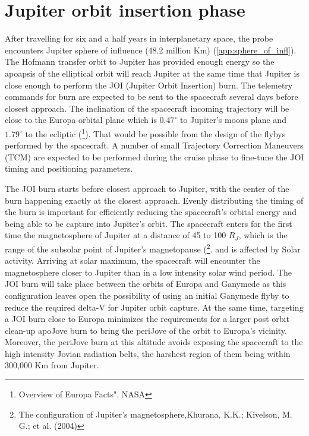 \section{Jupiter orbit insertion phase}
After travelling for six and a half years in interplanetary space, the probe encounters Jupiter sphere of influence (48.2 million Km) (\ref{app:sphere_of_infl}). The Hofmann transfer orbit to Jupiter has provided enough energy so the apoapsis of the elliptical orbit will reach Jupiter at the same time that Jupiter is close enough to perform the JOI (Jupiter Orbit Insertion) burn. The telemetry commands for burn are expected to be sent to the spacecraft several days before closest approach. The inclination of the spacecraft incoming trajectory will be close to the Europa orbital plane which is $0.47^\circ$ to Jupiter’s moons plane and $1.79^\circ$ to the ecliptic (\footnote{Overview of Europa Facts". NASA}). That would be possible from the design of the flybys performed by the spacecraft. A number of small Trajectory Correction Maneuvers (TCM) are expected to be performed during the cruise phase to fine-tune the JOI timing and positioning parameters.

The JOI burn starts before closest approach to Jupiter, with the center of the burn happening exactly at the closest approach. Evenly distributing the timing of the burn is important for efficiently reducing the spacecraft’s orbital energy and being able to be capture into Jupiter's orbit. The spacecraft enters for the first time the magnetosphere of Jupiter at a distance of 45 to 100 $R_J$, which is the range of the subsolar point of Jupiter’s magnetopause (\footnote{The configuration of Jupiter's magnetosphere,Khurana, K.K.; Kivelson, M. G.; et al. (2004)}. and is affected by Solar activity. Arriving at solar maximum, the spacecraft will encounter the magnetosphere closer to Jupiter than in a low intensity solar wind period. The JOI burn will take place between the orbits of Europa and Ganymede as this configuration leaves open the possibility of using an initial Ganymede flyby to reduce the required delta-V for Jupiter orbit capture. At the same time, targeting a JOI burn close to Europa minimizes the requirements for a larger post orbit clean-up apoJove burn to bring the periJove of the orbit to Europa’s vicinity. Moreover, the periJove burn at this altitude avoids exposing the spacecraft to the high intensity Jovian radiation belts, the harshest region of them being within 300,000 Km from Jupiter\cite{jupiter_radiation_harsh}.

